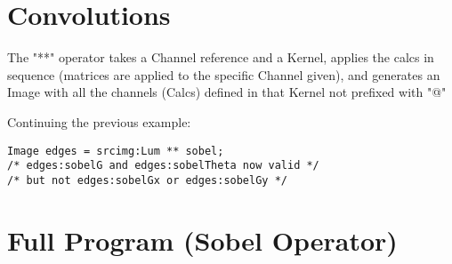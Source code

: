 \section{Convolutions}

The "**" operator takes a Channel reference and a Kernel,
applies the calcs in sequence (matrices are applied to the specific Channel given),
and generates an Image with all the channels (Calcs) defined in that Kernel not prefixed with "@"

Continuing the previous example:

\begin{lstlisting}[language=CLAM,escapechar=\%]
Image edges = srcimg:Lum ** sobel;
/* edges:sobelG and edges:sobelTheta now valid */
/* but not edges:sobelGx or edges:sobelGy */
\end{lstlisting}

\section{Full Program (Sobel Operator)}

 \clearpage


